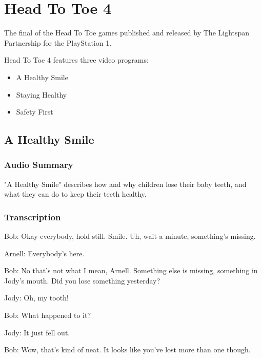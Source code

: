 \chapter{Head To Toe 4}


The final of the Head To Toe games published and released by The Lightspan Partnership for the PlayStation 1.

Head To Toe 4 features three video programs:

\begin{itemize}
    \item A Healthy Smile
    \item Staying Healthy
    \item Safety First
\end{itemize}

\clearpage
\newpage

\section{A Healthy Smile}

\subsection{Audio Summary}

"A Healthy Smile" describes how and why children lose their baby teeth, and what they can do to keep their teeth healthy.

\subsection{Transcription}

Bob: Okay everybody, hold still. Smile. Uh, wait a minute, something's missing.

Arnell: Everybody's here.

Bob: No that's not what I mean, Arnell. Something else is missing, something in Jody's mouth. Did you lose something yesterday?

Jody: Oh, my tooth!

Bob: What happened to it?

Jody: It just fell out.

Bob: Wow, that's kind of neat. It looks like you've lost more than one though.

